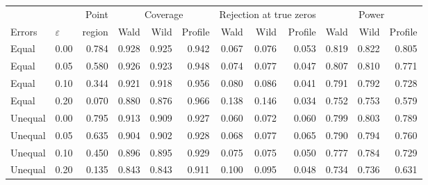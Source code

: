 \begin{tabular}{llrrrrrrrrrr}
\toprule
& & Point & \multicolumn{3}{c}{Coverage} & \multicolumn{3}{c}{Rejection at true zeros} & \multicolumn{3}{c}{Power} \\
\cmidrule(lr){4-6}\cmidrule(lr){7-9}\cmidrule(lr){10-12}
Errors & $\varepsilon$ & region & Wald & Wild & Profile & Wald & Wild & Profile & Wald & Wild & Profile \\
\midrule
Equal & 0.00 & 0.784 & 0.928 & 0.925 & 0.942 & 0.067 & 0.076 & 0.053 & 0.819 & 0.822 & 0.805 \\
Equal & 0.05 & 0.580 & 0.926 & 0.923 & 0.948 & 0.074 & 0.077 & 0.047 & 0.807 & 0.810 & 0.771 \\
Equal & 0.10 & 0.344 & 0.921 & 0.918 & 0.956 & 0.080 & 0.086 & 0.041 & 0.791 & 0.792 & 0.728 \\
Equal & 0.20 & 0.070 & 0.880 & 0.876 & 0.966 & 0.138 & 0.146 & 0.034 & 0.752 & 0.753 & 0.579 \\
\midrule
Unequal & 0.00 & 0.795 & 0.913 & 0.909 & 0.927 & 0.060 & 0.072 & 0.060 & 0.799 & 0.803 & 0.789 \\
Unequal & 0.05 & 0.635 & 0.904 & 0.902 & 0.928 & 0.068 & 0.077 & 0.065 & 0.790 & 0.794 & 0.760 \\
Unequal & 0.10 & 0.450 & 0.896 & 0.895 & 0.929 & 0.075 & 0.075 & 0.050 & 0.777 & 0.784 & 0.729 \\
Unequal & 0.20 & 0.135 & 0.843 & 0.843 & 0.911 & 0.100 & 0.095 & 0.048 & 0.734 & 0.736 & 0.631 \\
\bottomrule
\end{tabular}
